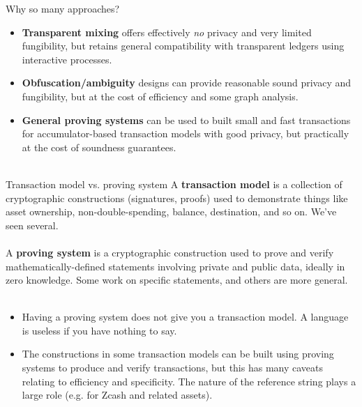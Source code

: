 \documentclass[aspectratio=169]{beamer}
\begin{document}
\begin{frame}{Why so many approaches?}
\begin{itemize}
\item \textbf{Transparent mixing} offers effectively \textit{no} privacy and very limited fungibility, but retains general compatibility with transparent ledgers using interactive processes.
\item \textbf{Obfuscation/ambiguity} designs can provide reasonable sound privacy and fungibility, but at the cost of efficiency and some graph analysis.
\item \textbf{General proving systems} can be used to built small and fast transactions for accumulator-based transaction models with good privacy, but practically at the cost of soundness guarantees. \\~\\
\end{itemize}
\end{frame}


\begin{frame}{Transaction model vs. proving system}
A \textbf{transaction model} is a collection of cryptographic constructions (signatures, proofs) used to demonstrate things like asset ownership, non-double-spending, balance, destination, and so on. We've seen several. \\~\\

A \textbf{proving system} is a cryptographic construction used to prove and verify mathematically-defined statements involving private and public data, ideally in zero knowledge. Some work on specific statements, and others are more general. \\~\\

\begin{itemize}
\item Having a proving system does not give you a transaction model. A language is useless if you have nothing to say.
\item The constructions in some transaction models can be built using proving systems to produce and verify transactions, but this has many caveats relating to efficiency and specificity. The nature of the reference string plays a large role (e.g. for Zcash and related assets).
\end{itemize}
\end{frame}
\end{document}
